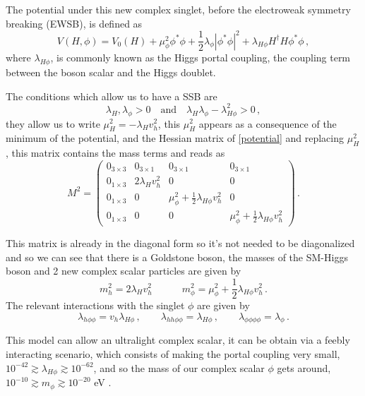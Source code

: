 The potential under this new complex singlet, before the electroweak symmetry breaking (EWSB), is defined as
\begin{equation}
	\label{potential}
	V(H,\phi)=V_0(H)+ \mu_\phi^2\phi^*\phi+\frac{1}{2}\lambda_\phi|\phi^*\phi|^2+\lambda_{H\phi}H^{\dag}H\phi^*\phi\,,
\end{equation}
where $\lambda_{H\phi}$, is commonly known as the Higgs portal coupling, the coupling term between the boson scalar and the Higgs doublet.

The conditions which allow us to have a SSB are
\begin{equation}
	\label{couplingtermconditions}
	\lambda_H,\lambda_\phi>0 \quad \textrm{and} \quad \lambda_H\lambda_\phi-\lambda_{H\phi}^2>0\,,    
\end{equation}
they allow us to write $\mu_H^2=-\lambda_Hv_h^2$, this $\mu_H^2$ appears as a consequence of the minimum of the potential, and the Hessian matrix of \autoref{potential} and replacing $\mu_H^2$, this matrix contains the mass terms and reads as \cite{Freitas_2021}
\begin{equation}
	M^2=\left( \begin{array}{cccc} 
		0_{3\times3} & 0_{3\times1} & 0_{3\times1} & 0_{3\times1} \\
		0_{1\times3} & 2\lambda_Hv_h^2 & 0 & 0 \\
		0_{1\times3} & 0 & \mu_\phi^2+\frac{1}{2}\lambda_{H\phi}v_h^2 & 0 \\
		0_{1\times3} & 0 & 0 & \mu_\phi^2+\frac{1}{2}\lambda_{H\phi}v_h^2
	\end{array}\right)\,.
\end{equation} 

This matrix is already in the diagonal form so it's not needed to be diagonalized and so we can see that there is a Goldstone boson, the masses of the SM-Higgs boson and 2 new complex scalar particles are given by
\begin{equation}
	m_h^2=2\lambda_Hv_h^2 \quad \quad \quad m_\phi^2=\mu_\phi^2+\frac{1}{2}\lambda_{H\phi}v_h^2\,.
\end{equation}
The relevant interactions with the singlet $\phi$ are given by
\begin{equation}
	\lambda_{h\phi\phi}=v_h\lambda_{H\phi}\,, \quad \quad
	\lambda_{hh\phi\phi}=\lambda_{H\phi}\,, \quad \quad
	\lambda_{\phi\phi\phi\phi}=\lambda_\phi\,.
\end{equation}

This model can allow an ultralight complex scalar, it can be obtain via a feebly interacting scenario, which consists of making the portal coupling very small, $10^{-42}\gtrsim \lambda_{H\phi} \gtrsim 10^{-62}$, and so the mass of our complex scalar $\phi$ gets around, $10^{-10}\gtrsim m_{\phi} \gtrsim 10^{-20}$ \si{\eV} \cite{Freitas_2021}.

